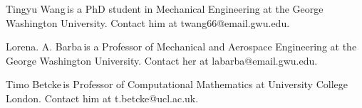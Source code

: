 \documentclass{IEEEcsmag}
\begin{document}
\begin{IEEEbiography}{Tingyu Wang}{\,}is a PhD student in Mechanical Engineering at the George Washington University. Contact him at twang66@email.gwu.edu.
\end{IEEEbiography}

\begin{IEEEbiography}{Lorena. A. Barba}{\,}is a Professor of Mechanical and Aerospace Engineering at the George Washington University.  Contact her at labarba@email.gwu.edu.
\end{IEEEbiography}

\begin{IEEEbiography}{Timo Betcke}{\,}is Professor of Computational Mathematics at University College London. Contact him at t.betcke@ucl.ac.uk.
\end{IEEEbiography}
\end{document}
